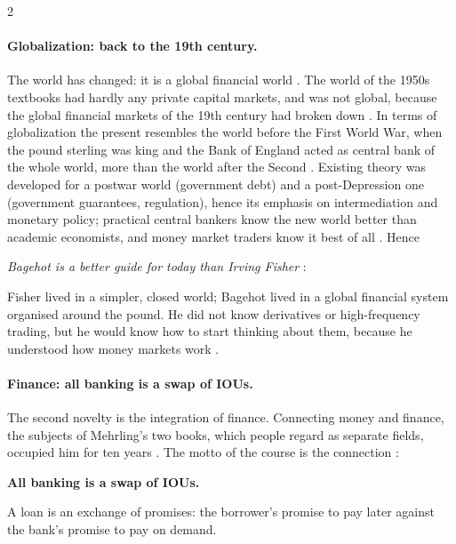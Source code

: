 \begin{paracol}{2}
\paragraph{Globalization: back to the 19th century.} The world has changed: it is a global financial world
. The world of the 1950s textbooks had hardly any private capital markets, and was not global, because
the global financial markets of the 19th century had broken down . In terms of globalization the
present resembles the world before the First World War, when the pound sterling was king and the Bank of England
acted as central bank of the whole world, more than the world after the Second . Existing theory was developed
for a postwar world (government debt) and a post-Depression one (government guarantees, regulation), hence its emphasis on
intermediation and monetary policy; practical central bankers know the new world better than academic economists, and
money market traders know it best of all . Hence
\begin{center}
\emph{Bagehot is a better guide for today than Irving Fisher} :
\end{center}
Fisher lived in a simpler, closed world; Bagehot lived in a global financial system organised around the pound. He did
not know derivatives or high-frequency trading, but he would know how to start thinking about them, because he
understood how money markets work .

\paragraph{Finance: all banking is a swap of IOUs.} The second novelty is the integration of finance. Connecting money
and finance, the subjects of Mehrling's two books, which people regard as separate fields, occupied him for ten years
. The motto of the course is the connection :

\begin{keyformulas}
\textbf{All banking is a swap of IOUs.} 

\smallskip
\begin{taccts}
\qquad
{}
\end{taccts}
A loan is an exchange of promises: the borrower's promise to pay later against the bank's promise to pay on demand.
\end{keyformulas}


\end{paracol}
